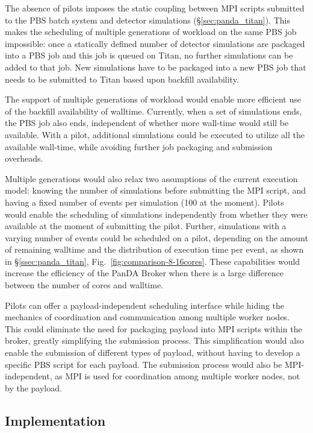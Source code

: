 \documentclass[conference]{IEEEtran}
\begin{document}
The absence of pilots imposes the static coupling between MPI scripts
submitted to the PBS batch system and detector simulations
(\S\ref{sec:panda_titan}). This makes the scheduling of multiple generations
of workload on the same PBS job impossible: once a statically defined number
of detector simulations are packaged into a PBS job and this job is queued on
Titan, no further simulations can be added to that job. New simulations have
to be packaged into a new PBS job that needs to be submitted to Titan based
upon backfill availability.

The support of  multiple generations of workload would enable more efficient use
of the backfill availability of walltime. Currently, when a set of simulations
ends, the PBS job also ends, independent of whether more wall-time would still
be available. With a pilot, additional simulations could be executed  to utilize
all the available wall-time, while avoiding further job packaging and submission
overheads.

Multiple generations would also relax two assumptions of the current execution
model: knowing the number of simulations before submitting the MPI script, and
having a fixed number of events per simulation (100 at the moment). Pilots would
enable the scheduling of simulations independently from whether they were
available at the moment of submitting the pilot. Further, simulations with a
varying number of events could be scheduled on a pilot, depending on the amount
of remaining walltime and the distribution of execution time per event, as shown
in \S\ref{ssec:panda_titan}, Fig.~\ref{fig:comparison-8-16cores}. These
capabilities would increase the efficiency of the PanDA Broker when there is a
large difference between the number of cores and walltime.

Pilots can offer a payload-independent scheduling interface while hiding the
mechanics of coordination and communication among multiple worker nodes. This
could eliminate the need for packaging payload into MPI scripts within the
broker, greatly simplifying the submission process. This simplification would
also enable the submission of different types of payload, without having to
develop a specific PBS script for each payload. The submission process would
also be MPI-independent, as MPI is used for coordination among multiple worker
nodes, not by the payload.

\subsection{Implementation}
\label{sec:arch}
\end{document}
